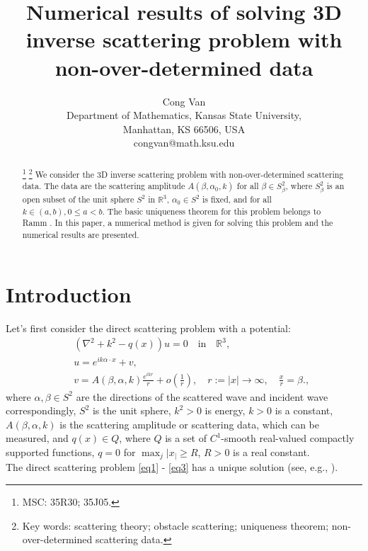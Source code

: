\documentclass[12pt]{article}
\theoremstyle{plain}
\begin{document}
\title{Numerical results of solving 3D inverse scattering problem with
non-over-determined data
}

\author{Cong Van\\
 Department  of Mathematics, Kansas State University, \\
 Manhattan, KS 66506, USA\\
congvan@math.ksu.edu\\
}

\date{}
\maketitle\thispagestyle{empty}

\begin{abstract}
\footnote{MSC: 35R30; 35J05.}
\footnote{Key words: scattering theory; obstacle scattering; uniqueness theorem; non-over-determined scattering data.
 }
\noindent We consider the 3D inverse scattering problem with non-over-determined scattering data. The data are the scattering amplitude $A(\beta, \alpha_0, k)$ for all $\beta \in S_\beta^2$, where $S_\beta^2$ is an open subset of the unit sphere $S^2$ in $\mathbb{R}^3$, $\alpha_0 \in S^2$ is fixed, and for all $k \in (a,b), 0 \leq a < b$. The basic uniqueness theorem for this problem belongs to Ramm \cite{R603}. In this paper, a numerical method is given for solving this problem and the numerical results are presented.
\end{abstract}

\section{Introduction}\label{sec1}
Let's first consider the direct scattering problem with a potential:
\begin{eqnarray}
&&(\nabla^2 + k^2 - q(x))u = 0 \quad \text{in} \quad \mathbb{R}^3,\label{eq1}\\
&&u = e^{ik\alpha\cdot x} + v,\label{eq2}\\
&&v = A(\beta, \alpha, k)\frac{e^{ikr}}{r} + o\left(\frac{1}{r} \right), \quad r := |x| \to \infty, \quad \frac{x}{r} = \beta.\label{eq3},
\end{eqnarray}
where $\alpha,\beta \in S^2$ are the directions of the scattered wave and incident wave correspondingly, $S^2$ is the unit sphere, $k^2 > 0$ is energy, $k > 0$ is a constant, $A(\beta,\alpha,k)$ is the scattering amplitude or scattering data, which can be measured, and $q(x) \in Q$, where $Q$ is a set of $C^1$-smooth real-valued compactly supported functions, $q = 0$ for $\max_j|x_| \geq R$, $R > 0$ is a real constant.\\
The direct scattering problem \eqref{eq1} - \eqref{eq3} has a unique solution (see, e.g., \cite{R470}).\\
\end{document}
